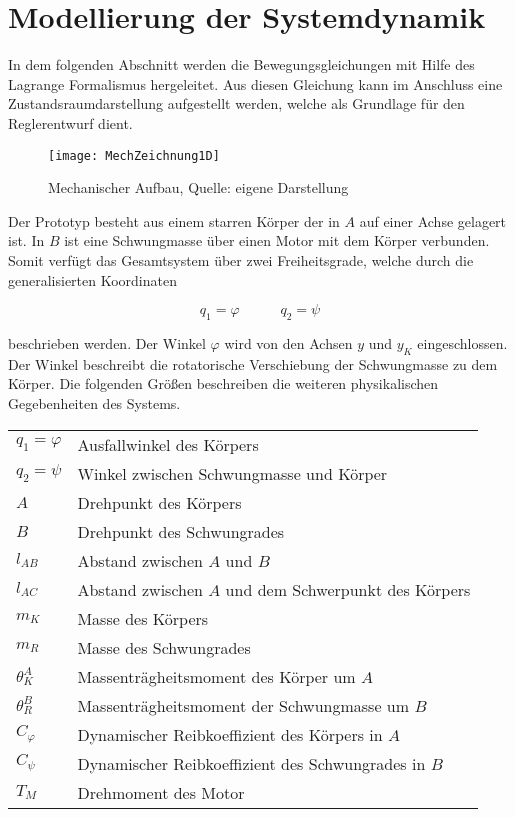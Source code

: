 \section{Modellierung der Systemdynamik} \label{Dynamik_sec}
In dem folgenden Abschnitt werden die Bewegungsgleichungen mit Hilfe des Lagrange Formalismus hergeleitet. Aus diesen Gleichung kann im Anschluss eine Zustandsraumdarstellung aufgestellt werden, welche als Grundlage für den Reglerentwurf dient.

\begin{figure}[h]
\centering
\texttt{[image: MechZeichnung1D]}
\caption{Mechanischer Aufbau, Quelle: eigene Darstellung}
\end{figure}

Der Prototyp besteht aus einem starren Körper der in $A$ auf einer Achse gelagert ist. In $B$ ist eine Schwungmasse über einen Motor mit dem Körper verbunden. Somit verfügt das Gesamtsystem über zwei Freiheitsgrade, welche durch die generalisierten Koordinaten 

\begin{equation}
q_1 = \varphi \hspace{35pt} q_2 = \psi
\end{equation}

beschrieben werden. Der Winkel $\varphi$ wird von den Achsen $y$ und $y_K$ eingeschlossen. Der Winkel beschreibt die rotatorische Verschiebung der Schwungmasse zu dem Körper. Die folgenden Größen beschreiben die weiteren physikalischen Gegebenheiten des Systems.\newline

\begin{table}[h]
\centering
\begin{tabular}{ll}
	$q_1 = \varphi$ & Ausfallwinkel des Körpers \\
	$q_2 = \psi$ & Winkel zwischen Schwungmasse und Körper \\
	$A$ & Drehpunkt des Körpers \\
	$B$ & Drehpunkt des Schwungrades \\
	$l_{AB}$ & Abstand zwischen $A$ und $B$ \\
	$l_{AC}$ & Abstand zwischen $A$ und dem Schwerpunkt des Körpers \\
	$m_K$ & Masse des Körpers \\
	$m_R$ & Masse des Schwungrades \\
	${\theta}^A_K$ & Massenträgheitsmoment des Körper um $A$ \\
	${\theta}^B_R$ & Massenträgheitsmoment der Schwungmasse um $B$ \\
	$C_{\varphi}$ & Dynamischer Reibkoeffizient des Körpers in $A$ \\
	$C_{\psi}$ & Dynamischer Reibkoeffizient des Schwungrades in $B$ \\
	$T_M$ & Drehmoment des Motor
\end{tabular}
\end{table}


